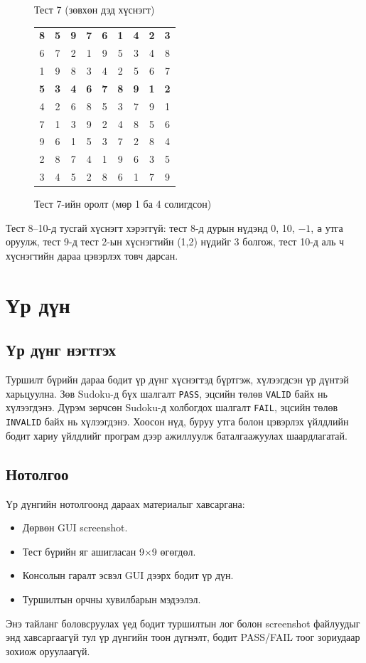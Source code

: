 \documentclass[12pt,a4paper]{report}
\newcommand{\sgrid}[9]{{\small\setlength{\tabcolsep}{3.5pt}\begin{tabular}{|ccc|ccc|ccc|}\hline #1\\#2\\#3\\\hline #4\\#5\\#6\\\hline #7\\#8\\#9\\\hline\end{tabular}}}
\begin{document}
\begin{figure}[H]\centering
	\begin{minipage}[t]{0.4\textwidth}\centering Тест 7 (зөвхөн дэд хүснэгт)\par\sgrid{\textbf{8}&\textbf{5}&\textbf{9}&\textbf{7}&\textbf{6}&\textbf{1}&\textbf{4}&\textbf{2}&\textbf{3}}{6&7&2&1&9&5&3&4&8}{1&9&8&3&4&2&5&6&7}{\textbf{5}&\textbf{3}&\textbf{4}&\textbf{6}&\textbf{7}&\textbf{8}&\textbf{9}&\textbf{1}&\textbf{2}}{4&2&6&8&5&3&7&9&1}{7&1&3&9&2&4&8&5&6}{9&6&1&5&3&7&2&8&4}{2&8&7&4&1&9&6&3&5}{3&4&5&2&8&6&1&7&9}\end{minipage}
	\caption{Тест 7-ийн оролт (мөр 1 ба 4 солигдсон)}\label{fig:g3}
\end{figure}
Тест 8--10-д тусгай хүснэгт хэрэггүй: тест 8-д дурын нүдэнд 0, 10, $-1$, \texttt{a} утга оруулж, тест 9-д тест 2-ын хүснэгтийн (1,2) нүдийг 3 болгож, тест 10-д аль ч хүснэгтийн дараа цэвэрлэх товч дарсан.

%
	\chapter{Үр дүн}
	
	\section{Үр дүнг нэгтгэх}
	Туршилт бүрийн дараа бодит үр дүнг хүснэгтэд бүртгэж, хүлээгдсэн үр дүнтэй харьцуулна. Зөв Sudoku-д бүх шалгалт \texttt{PASS}, эцсийн төлөв \texttt{VALID} байх нь хүлээгдэнэ. Дүрэм зөрчсөн Sudoku-д холбогдох шалгалт \texttt{FAIL}, эцсийн төлөв \texttt{INVALID} байх нь хүлээгдэнэ. Хоосон нүд, буруу утга болон цэвэрлэх үйлдлийн бодит хариу үйлдлийг програм дээр ажиллуулж баталгаажуулах шаардлагатай.
	
	\section{Нотолгоо}
	Үр дүнгийн нотолгоонд дараах материалыг хавсаргана:
	\begin{itemize}
		\item Дөрвөн GUI screenshot.
		\item Тест бүрийн яг ашигласан 9$\times$9 өгөгдөл.
		\item Консолын гаралт эсвэл GUI дээрх бодит үр дүн.
		\item Туршилтын орчны хувилбарын мэдээлэл.
	\end{itemize}
	Энэ тайланг боловсруулах үед бодит туршилтын лог болон screenshot файлуудыг энд хавсаргаагүй тул үр дүнгийн тоон дүгнэлт, бодит PASS/FAIL тоог зориудаар зохиож оруулаагүй.
\end{document}
